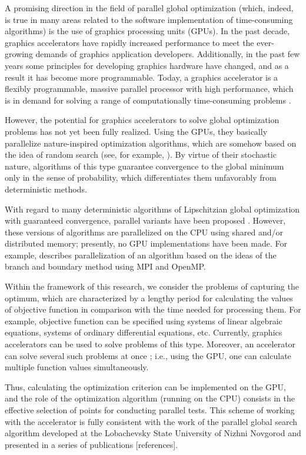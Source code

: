 \documentclass{svproc}
\begin{document}
A promising direction in the field of parallel global optimization (which, indeed, is true in many areas related to the software implementation of time-consuming algorithms) is the use of graphics processing units (GPUs). In the past decade, graphics accelerators have rapidly increased performance to meet the ever-growing demands of graphics application developers. Additionally, in the past few years some principles for developing graphics hardware have changed, and as a result it has become more programmable. Today, a graphics accelerator is a flexibly programmable, massive parallel processor with high performance, which is in demand for solving a range of computationally time-consuming problems \cite{Ref1}.

However, the potential for graphics accelerators to solve global optimization problems has not yet been fully realized. Using the GPUs, they basically parallelize nature-inspired optimization algorithms, which are somehow based on the idea of random search (see, for example, \cite{Ref2,Ref3,Ref4}). By virtue of their stochastic nature, algorithms of this type guarantee convergence to the global minimum only in the sense of probability, which differentiates them unfavorably from deterministic methods.

With regard to many deterministic algorithms of Lipschitzian global optimization with guaranteed convergence, parallel variants have been proposed \cite{Ref5,Ref6,Ref7}. However, these versions of algorithms are parallelized on the CPU using shared and/or distributed memory; presently, no GPU implementations have been made. For example, \cite{Ref7} describes parallelization of an algorithm based on the ideas of the branch and boundary method using MPI and OpenMP.

Within the framework of this research, we consider the problems of capturing the optimum, which are characterized by a lengthy period for calculating the values of objective function in comparison with the time needed for processing them. For example, objective function can be specified using systems of linear algebraic equations, systems of ordinary differential equations, etc. Currently, graphics accelerators can be used to solve problems of this type. Moreover, an accelerator can solve several such problems at once \cite{Ref8}; i.e., using the GPU, one can calculate multiple function values simultaneously.

Thus, calculating the optimization criterion can be implemented on the GPU, and the role of the optimization algorithm (running on the CPU) consists in the effective selection of points for conducting parallel tests. This scheme of working with the accelerator is fully consistent with the work of the parallel global search algorithm developed at the Lobachevsky State University of Nizhni Novgorod and presented in a series of publications [references].
\end{document}
